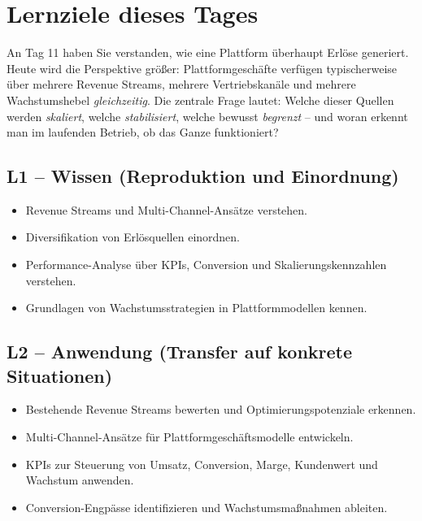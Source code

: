 \documentclass[11pt,a4paper,oneside]{article}
\begin{document}
\section*{Lernziele dieses Tages}
\thispagestyle{plain}

\noindent An Tag 11 haben Sie verstanden, wie eine Plattform überhaupt Erlöse generiert. Heute wird die Perspektive größer: Plattformgeschäfte verfügen typischerweise über mehrere Revenue Streams, mehrere Vertriebskanäle und mehrere Wachstumshebel \emph{gleichzeitig}. Die zentrale Frage lautet: Welche dieser Quellen werden \emph{skaliert}, welche \emph{stabilisiert}, welche bewusst \emph{begrenzt} -- und woran erkennt man im laufenden Betrieb, ob das Ganze funktioniert?

\subsection*{L1 -- Wissen (Reproduktion und Einordnung)}
\begin{itemize}
  \item Revenue Streams und Multi-Channel-Ansätze verstehen.
  \item Diversifikation von Erlösquellen einordnen.
  \item Performance-Analyse über KPIs, Conversion und Skalierungskennzahlen verstehen.
  \item Grundlagen von Wachstumsstrategien in Plattformmodellen kennen.
\end{itemize}

\subsection*{L2 -- Anwendung (Transfer auf konkrete Situationen)}
\begin{itemize}
  \item Bestehende Revenue Streams bewerten und Optimierungspotenziale erkennen.
  \item Multi-Channel-Ansätze für Plattformgeschäftsmodelle entwickeln.
  \item KPIs zur Steuerung von Umsatz, Conversion, Marge, Kundenwert und Wachstum anwenden.
  \item Conversion-Engpässe identifizieren und Wachstumsmaßnahmen ableiten.
\end{itemize}
\end{document}
